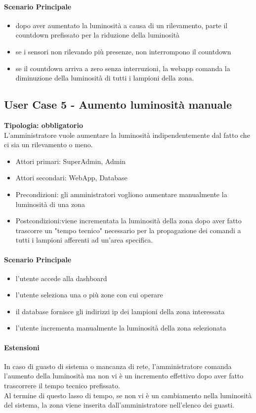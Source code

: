 \documentclass[12pt]{article}
\begin{document}
\paragraph{Scenario Principale}
\begin{itemize}
	\item dopo aver aumentato la luminosità a causa di un rilevamento, parte il countdown prefissato per la riduzione della luminosità
	\item se i sensori non rilevando più presenze, non interrompono il countdown
	\item se il countdown arriva a zero senza interruzioni, la webapp comanda la diminuzione della luminosità di tutti i lampioni della zona.
\end{itemize}

\subsection{User Case 5 - Aumento luminosità manuale}
\textbf{Tipologia: obbligatorio} \\
L'amministratore vuole aumentare la luminosità indipendentemente dal fatto che ci sia un rilevamento o meno.
\begin{itemize}
	\item Attori primari: SuperAdmin, Admin
	\item Attori secondari: WebApp, Database
	\item Precondizioni: gli amministratori vogliono aumentare manualmente la luminosità di una zona
	\item Postcondizioni:viene incrementata la luminosità della zona dopo aver fatto trascorre un "tempo tecnico" necessario per la propagazione dei comandi a tutti i lampioni afferenti ad un'area specifica.
\end{itemize}
\paragraph{Scenario Principale}
\begin{itemize}
	\item l'utente accede alla dashboard
	\item l'utente seleziona una o più zone con cui operare
	\item il database fornisce gli indirizzi ip dei lampioni della zona interessata
	\item l'utente incrementa manualmente la luminosità della zona selezionata
\end{itemize}
\paragraph{Estensioni} In caso di guasto di sistema o mancanza di rete, l'amministratore comanda l'aumento della luminosità ma non vi è un incremento effettivo dopo aver fatto trascorrere il tempo tecnico prefissato.\\
Al termine di questo lasso di tempo, se non vi è un cambiamento nella luminosità del sistema, la zona viene inserita dall'amministratore nell'elenco dei guasti. 
\end{document}
